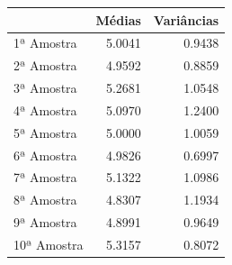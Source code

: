 \begin{tabular}{lrr}
\toprule
 & Médias & Variâncias \\
\midrule
1ª Amostra & 5.0041 & 0.9438 \\
2ª Amostra & 4.9592 & 0.8859 \\
3ª Amostra & 5.2681 & 1.0548 \\
4ª Amostra & 5.0970 & 1.2400 \\
5ª Amostra & 5.0000 & 1.0059 \\
6ª Amostra & 4.9826 & 0.6997 \\
7ª Amostra & 5.1322 & 1.0986 \\
8ª Amostra & 4.8307 & 1.1934 \\
9ª Amostra & 4.8991 & 0.9649 \\
10ª Amostra & 5.3157 & 0.8072 \\
\bottomrule
\end{tabular}
